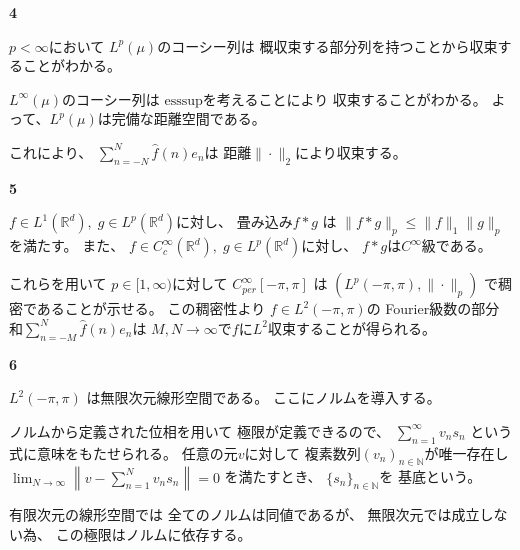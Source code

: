 \documentclass[12pt,b5paper]{ltjsarticle}
\begin{document}
\hrulefill

\newpage

\hrulefill
\textbf{4}
\hrulefill

$p<\infty$において
$L^{p}(\mu)$のコーシー列は
概収束する部分列を持つことから収束することがわかる。

$L^{\infty}(\mu)$のコーシー列は
$\mathrm{ess sup}$を考えることにより
収束することがわかる。
よって、$L^{p}(\mu)$は完備な距離空間である。

これにより、
$\displaystyle \sum_{n=-N}^{N}\hat{f}(n)e_{n}$は
距離$\| \cdot \|_{2}$により収束する。


\hrulefill



\hrulefill
\textbf{5}
\hrulefill

%
%
%
%



$f \in L^{1}(\mathbb{R}^{d}), \; g\in L^{p}(\mathbb{R}^{d})$に対し、
畳み込み$f\ast g$ は $\|f\ast g\|_{p} \leq \|f\|_{1} \| g\|_{p}$を満たす。
また、
$f\in C_{c}^{\infty}(\mathbb{R}^{d}), \; g\in L^{p}(\mathbb{R}^{d})$に対し、
$f\ast g$は$C^{\infty}$級である。

これらを用いて
$p\in [1,\infty)$に対して
$C_{per}^{\infty}[-\pi,\pi]$
 は
$(L^{p}(-\pi,\pi),\|\cdot\|_{p})$
で稠密であることが示せる。
この稠密性より
$f\in L^{2}(-\pi,\pi)$の
Fourier級数の部分和$\sum_{n=-M}^{N}\widehat{f}(n)e_{n}$は
$M,N\to \infty$で$f$に$L^{2}$収束することが得られる。


\hrulefill



\hrulefill
\textbf{6}
\hrulefill

$L^{2}(-\pi,\pi)$
は無限次元線形空間である。
ここにノルムを導入する。

ノルムから定義された位相を用いて
極限が定義できるので、
$\sum_{n=1}^{\infty}v_{n}s_{n}$
という式に意味をもたせられる。
任意の元$v$に対して
複素数列$(v_{n})_{n\in\mathbb{N}}$が唯一存在し
$\lim_{N\to\infty} \left\| v - \sum_{n=1}^{N}v_{n}s_{n} \right\| = 0$
を満たすとき、
$\{s_{n}\}_{n\in\mathbb{N}}$を
 基底という。

有限次元の線形空間では
全てのノルムは同値であるが、
無限次元では成立しない為、
この極限はノルムに依存する。





\hrulefill
\end{document}
